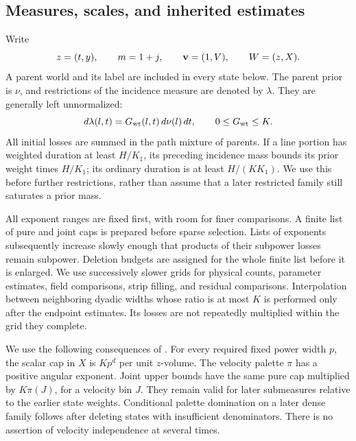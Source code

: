 \subsection{Measures, scales, and inherited estimates}

Write
\[
 z=(t,y),\qquad m=1+j,\qquad {\bf v}=(1,V),\qquad W=(z,X).
\]
A parent world and its label are included in every state below.
The parent prior is \(\nu\), and restrictions of the incidence measure
are denoted by \(\lambda\). They are generally left unnormalized:
\begin{equation}\label{a05:incidence-density}
 d\lambda(l,t)=G_{\rm wt}(l,t)\,d\nu(l)\,dt,
 \qquad 0\leq G_{\rm wt}\leq K.
\end{equation}
All initial losses are summed in the path mixture of parents.
If a line portion has weighted duration at least \(H/K_1\),
its preceding incidence mass bounds its prior weight times \(H/K_1\);
its ordinary duration is at least \(H/(KK_1)\).
We use this before further restrictions, rather than assume that a
later restricted family still saturates a prior mass.

All exponent ranges are fixed first, with room for finer
comparisons. A finite list of pure and joint caps is prepared
before sparse selection. Lists of exponents subsequently increase
slowly enough that products of their subpower losses remain
subpower. Deletion budgets are assigned for the whole finite list
before it is enlarged. We use successively slower grids for
physical counts, parameter estimates, field comparisons, strip
filling, and residual comparisons. Interpolation between neighboring
dyadic widths whose ratio is at most \(K\) is performed only after
the endpoint estimates. Its losses are not repeatedly multiplied
within the grid they complete.

We use the following consequences of
.
For every required fixed power width \(p\), the scalar cap in \(X\)
is \(Kp^d\) per unit \(z\)-volume. The velocity palette \(\pi\)
has a positive angular exponent. Joint upper bounds have the same
pure cap multiplied by \(K\pi(J)\), for a velocity bin \(J\).
They remain valid for later submeasures relative to the earlier
state weights. Conditional palette domination on a later dense
family follows after deleting states with insufficient denominators.
There is no assertion of velocity independence at several times.

